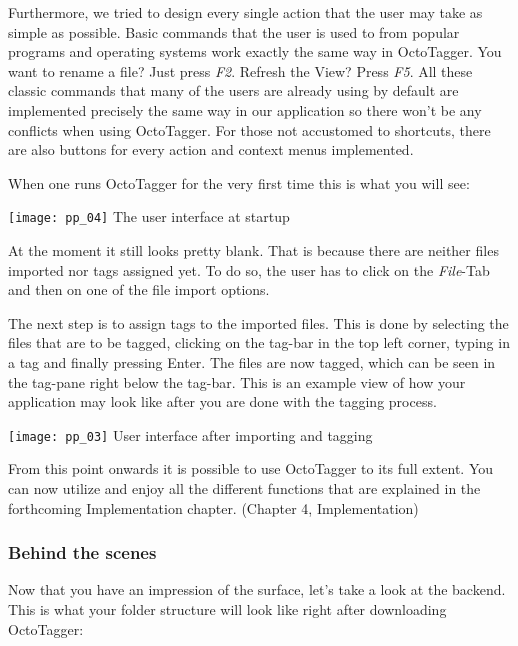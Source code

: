 Furthermore, we tried to design every single action that the user may take as simple as possible. Basic commands that the user is used to from popular programs and operating systems work exactly the same way in OctoTagger. You want to rename a file? Just press \textit{F2}. Refresh the View? Press \textit{F5}. All these classic commands that many of the users are already using by default are implemented precisely the same way in our application so there won't be any conflicts when using OctoTagger. For those not accustomed to shortcuts, there are also buttons for every action and context menus implemented.

When one runs OctoTagger for the very first time this is what you will see:

\begin{center}
\texttt{[image: pp\_04]}
\small{The user interface at startup}
\end{center}


At the moment it still looks pretty blank. That is because there are neither files imported nor tags assigned yet. To do so, the user has to click on the \textit{File}-Tab and then on one of the file import options.

The next step is to assign tags to the imported files. This is done by selecting the files that are to be tagged, clicking on the tag-bar in the top left corner, typing in a tag and finally pressing Enter. The files are now tagged, which can be seen in the tag-pane right below the tag-bar.
This is an example view of how your application may look like after you are done with the tagging process.

\begin{center}
\texttt{[image: pp\_03]}
\small{User interface after importing and tagging}
\end{center}


From this point onwards it is possible to use OctoTagger to its full extent. You can now utilize and enjoy all the different functions that are explained in the forthcoming Implementation chapter. (Chapter 4, Implementation)

\subsubsection{Behind the scenes}
Now that you have an impression of the surface, let's take a look at the backend. This is what your folder structure will look like right after downloading OctoTagger:

